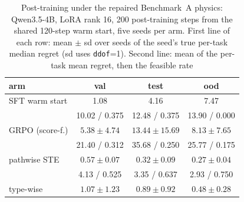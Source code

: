 \documentclass[journal]{IEEEtran}
\begin{document}
\begin{table}[t]\centering\caption{Post-training under the repaired Benchmark~A physics: Qwen3.5-4B, LoRA
rank 16, 200 post-training steps from the shared 120-step warm start, five seeds per
arm.  First line of each row: mean $\pm$ sd over seeds of the seed's true per-task
median regret (sd uses \texttt{ddof}=1).  Second line: mean of the per-task mean
regret, then the feasible rate}\label{tab:e2}
\par
\footnotesize\setlength{\tabcolsep}{4pt}
\begin{tabular}{@{}lccc@{}}\toprule
arm & val & test & ood\\\midrule
SFT warm start & 1.08 & 4.16 & 7.47\\
 & 10.02 / 0.375 & 12.48 / 0.375 & 13.90 / 0.000\\
GRPO (score-f.) & $5.38\pm4.74$ & $13.44\pm15.69$ & $8.13\pm7.65$\\
 & 21.40 / 0.312 & 35.68 / 0.250 & 25.77 / 0.175\\
pathwise STE & $\mathbf{0.57\pm0.07}$ & $\mathbf{0.32\pm0.09}$ & $\mathbf{0.27\pm0.04}$\\
 & 4.13 / 0.525 & 3.35 / 0.637 & 2.93 / 0.750\\
type-wise & $1.07\pm1.23$ & $0.89\pm0.92$ & $0.48\pm0.28$\\

\end{tabular}
\end{table}
\end{document}
